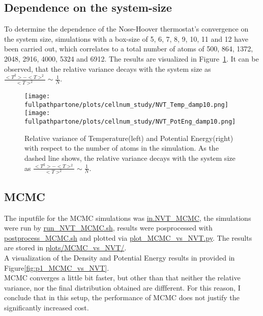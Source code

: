 \documentclass[10pt,a4paper]{report}
\def \pathpartone {../../1_three-dimensional_atomic_system}
\def \fullpathpartone {/home/lukas/Desktop/project/independence/atomistic_modeling/exam/1_three-dimensional_atomic_system}
\begin{document}
\subsection{Dependence on the system-size}
To determine the dependence of the Nose-Hoover thermostat's convergence on the system size, simulations with a box-size of 5, 6, 7, 8, 9, 10, 11 and 12 have been carried out, which correlates to a total number of atoms of 500, 864, 1372, 2048, 2916, 4000, 5324 and 6912. The results are visualized in Figure~\ref{fig:p1_cellnum_study}. It can be observed, that the relative variance decays with the system size as $\frac{<T^2>-<T>^2}{<T>^2}\sim\frac{1}{N}$.

\begin{center}
\begin{figure}[h]
\texttt{[image: \\fullpathpartone/plots/cellnum\_study/NVT\_Temp\_damp10.png]}
\texttt{[image: \\fullpathpartone/plots/cellnum\_study/NVT\_PotEng\_damp10.png]}
\caption[aaa]{Relative variance of Temperature(left) and Potential Energy(right) with respect to the number of atoms in the simulation. As the dashed line shows, the relative variance decays with the system size as $\frac{<T^2>-<T>^2}{<T>^2}\sim\frac{1}{N}$.}
\label{fig:p1_cellnum_study}
\end{figure}
\end{center}


\subsection{MCMC}
The inputfile for the MCMC simulations was \href{\pathpartone/in.NVT_MCMC}{in.NVT\_MCMC}, the simulations were run by \href{\pathpartone/run_NVT_MCMC.sh}{run\_NVT\_MCMC.sh}, results were posprocessed with \href{\pathpartone/postprocess_MCMC.sh}{postprocess\_MCMC.sh} and plotted via \href{\pathpartone/plot_MCMC_vs_NVT.py}{plot\_MCMC\_vs\_NVT.py}.
The results are stored in \href{\pathpartone/plots/MCMC_vs_NVT/}{plots/MCMC\_vs\_NVT/}.\\
A visualization of the Density and Potential Energy results in provided in Figure\ref{fig:p1_MCMC_vs_NVT}.\\
MCMC converges a little bit faster, but other than that neither the relative variance, nor the final distribution obtained are diffferent. For this reason, I conclude that in this setup, the performance of MCMC does not justify the significantly increased cost.
\end{document}
